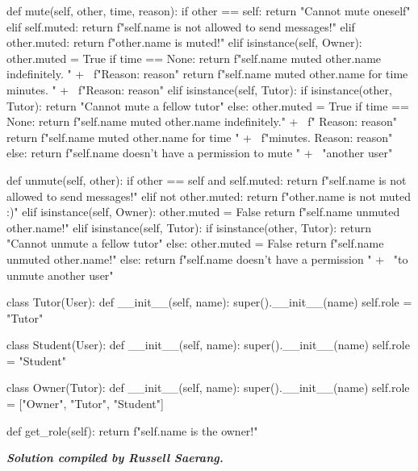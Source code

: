 \begin{python}
    def mute(self, other, time, reason):
        if other == self:
            return "Cannot mute oneself"
        elif self.muted:
            return f"{self.name} is not allowed to send messages!"
        elif other.muted:
            return f"{other.name} is muted!"
        elif isinstance(self, Owner):
            other.muted = True
            if time == None:
                return f"{self.name} muted {other.name} indefinitely. " + \
                       f"Reason: {reason}"
            return f"{self.name} muted {other.name} for {time} minutes. " + \
                   f"Reason: {reason}"
        elif isinstance(self, Tutor):
            if isinstance(other, Tutor):
                return "Cannot mute a fellow tutor"
            else:
                other.muted = True
                if time == None:
                    return f"{self.name} muted {other.name} indefinitely." + \
                           f" Reason: {reason}"
                return f"{self.name} muted {other.name} for {time} " + \
                       f"minutes. Reason: {reason}"
        else:
            return f"{self.name} doesn't have a permission to mute " + \
                   "another user"


    def unmute(self, other):
        if other == self and self.muted:
            return f"{self.name} is not allowed to send messages!"
        elif not other.muted:
            return f"{other.name} is not muted :)"
        elif isinstance(self, Owner):
            other.muted = False
            return f"{self.name} unmuted {other.name}!"
        elif isinstance(self, Tutor):
            if isinstance(other, Tutor):
                return "Cannot unmute a fellow tutor"
            else:
                other.muted = False
                return f"{self.name} unmuted {other.name}!"
        else:
            return f"{self.name} doesn't have a permission " + \
                   "to unmute another user"

class Tutor(User):
    def __init__(self, name):
        super().__init__(name)
        self.role = "Tutor"

class Student(User):
    def __init__(self, name):
        super().__init__(name)
        self.role = "Student"

class Owner(Tutor):
    def __init__(self, name):
        super().__init__(name)
        self.role = ["Owner", "Tutor", "Student"]

    def get_role(self):
        return f"{self.name} is the owner!"
\end{python}

\begin{flushright}
\vspace{2 cm}\textbf{\textit{Solution compiled by Russell Saerang.}}
\end{flushright}
